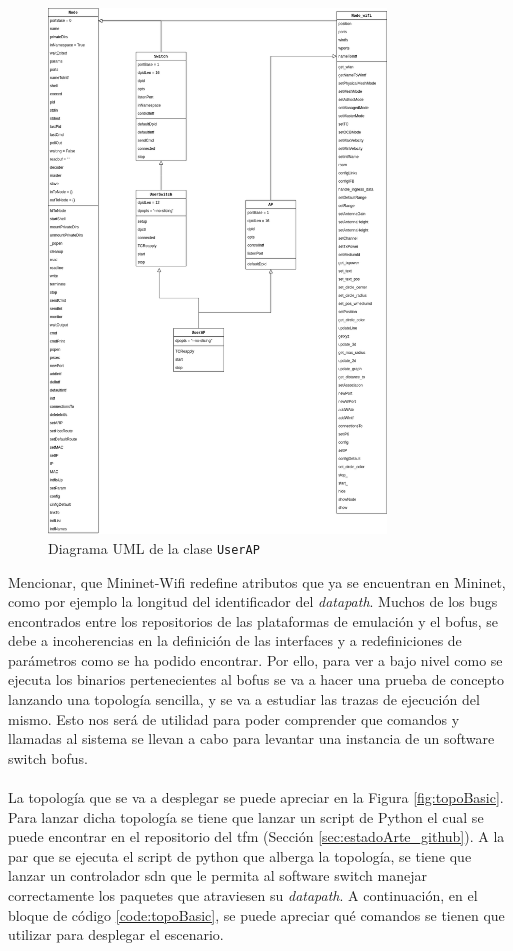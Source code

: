 \begin{figure}[ht!]
    \centering
    \includegraphics[width=0.8\textwidth]{archivos/img/analisis/userAP.png}
    \caption{Diagrama UML de la clase \texttt{UserAP}}
    \label{fig:userAP}
\end{figure}

Mencionar, que Mininet-Wifi redefine atributos que ya se encuentran en Mininet, como por ejemplo la longitud del identificador del \textit{datapath}. Muchos de los bugs encontrados entre los repositorios de las plataformas de emulación y el \gls{bofus}, se debe a incoherencias en la definición de las interfaces y a redefiniciones de parámetros como se ha podido encontrar. Por ello, para ver a bajo nivel como se ejecuta los binarios pertenecientes al \gls{bofus} se va a hacer una prueba de concepto lanzando una topología sencilla, y se va a estudiar las trazas de ejecución del mismo. Esto nos será de utilidad para poder comprender que comandos y llamadas al sistema se llevan a cabo para levantar una instancia de un software switch \gls{bofus}.\\
\\
La topología que se va a desplegar se puede apreciar en la Figura \ref{fig:topoBasic}. Para lanzar dicha topología se tiene que lanzar un script de Python el cual se puede encontrar en el repositorio del \gls{tfm} (Sección \ref{sec:estadoArte_github}). A la par que se ejecuta el script de python que alberga la topología, se tiene que lanzar un controlador \gls{sdn} que le permita al software switch manejar correctamente los paquetes que atraviesen su \textit{datapath}. A continuación, en el bloque de código \ref{code:topoBasic}, se puede apreciar qué comandos se tienen que utilizar para  desplegar el escenario. \\

